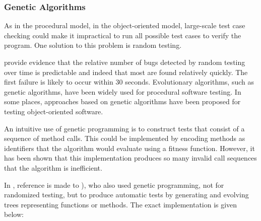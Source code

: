 \documentclass[12pt]{article}
\begin{document}
\subsubsection{Genetic Algorithms}

As in the procedural model, in the object-oriented model, large-scale test case checking could make it impractical to run all possible test cases to verify the program. One solution to this problem is random testing.

\par \textcite{ciupa} provide evidence that the relative number of bugs detected by random testing over time is predictable and indeed that most are found relatively quickly. The first failure is likely to occur within 30 seconds. Evolutionary algorithms, such as genetic algorithms, have been widely used for procedural software testing. In some places, approaches based on genetic algorithms have been proposed for testing object-oriented software.

\par An intuitive use of genetic programming is to construct tests that consist of a sequence of method calls. This could be implemented by encoding methods as identifiers that the algorithm would evaluate using a fitness function. However, it has been shown that this implementation produces so many invalid call sequences that the algorithm is inefficient.

\par In \textcite{meziane}, reference is made to \textcite{wappler}), who also used genetic programming, not for randomized testing, but to produce automatic tests by generating and evolving trees representing functions or methods. The exact implementation is given below:
\end{document}
